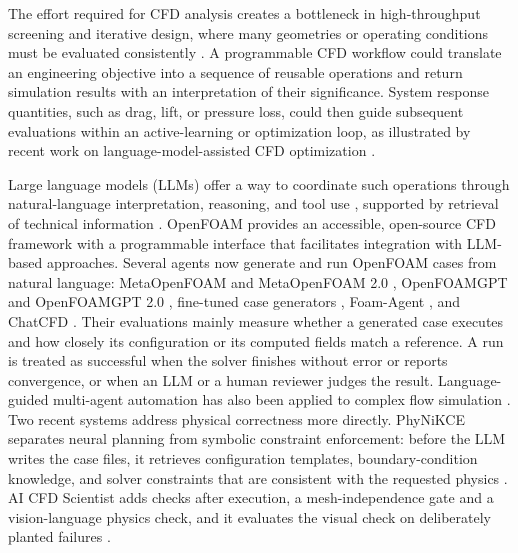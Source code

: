 \documentclass[11pt]{article}
\begin{document}
The effort required for CFD analysis creates a bottleneck in high-throughput screening and iterative design, where many geometries or operating conditions must be evaluated consistently \cite{forrester2009surrogate,brunton2020mlfluids}. A programmable CFD workflow could translate an engineering objective into a sequence of reusable operations and return simulation results with an interpretation of their significance. System response quantities, such as drag, lift, or pressure loss, could then guide subsequent evaluations within an active-learning or optimization loop, as illustrated by recent work on language-model-assisted CFD optimization \cite{chen2026optmeta}.

Large language models (LLMs) offer a way to coordinate such operations through natural-language interpretation, reasoning, and tool use \cite{yao2023react,schick2023toolformer}, supported by retrieval of technical information \cite{lewis2020rag}. OpenFOAM \cite{weller1998tensorial} provides an accessible, open-source CFD framework with a programmable interface that facilitates integration with LLM-based approaches. Several agents now generate and run OpenFOAM cases from natural language: MetaOpenFOAM and MetaOpenFOAM 2.0 \cite{chen2024metaopenfoam,chen2025metaopenfoam2}, OpenFOAMGPT and OpenFOAMGPT 2.0 \cite{pandey2025openfoamgpt,feng2026openfoamgpt2}, fine-tuned case generators \cite{dong2025autocfd}, Foam-Agent \cite{yue2026foamagent}, and ChatCFD \cite{fan2026chatcfd}. Their evaluations mainly measure whether a generated case executes and how closely its configuration or its computed fields match a reference. A run is treated as successful when the solver finishes without error or reports convergence, or when an LLM or a human reviewer judges the result. Language-guided multi-agent automation has also been applied to complex flow simulation \cite{xu2025cfdagent}. Two recent systems address physical correctness more directly. PhyNiKCE separates neural planning from symbolic constraint enforcement: before the LLM writes the case files, it retrieves configuration templates, boundary-condition knowledge, and solver constraints that are consistent with the requested physics \cite{fan2026phynikce}. AI CFD Scientist adds checks after execution, a mesh-independence gate and a vision-language physics check, and it evaluates the visual check on deliberately planted failures \cite{somasekharan2026aicfd}.
\end{document}
